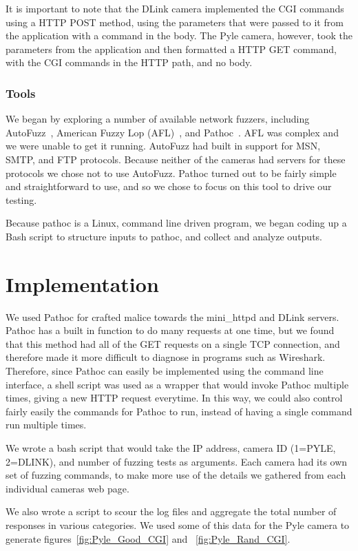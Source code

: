 \documentclass[letterpaper,twocolumn,10pt]{article}
\begin{document}
It is important to note that the DLink camera implemented the CGI commands using a HTTP POST method, using the parameters that were passed to it from the application with a command in the body. The Pyle camera, however, took the parameters from the application and then formatted a HTTP GET command, with the CGI commands in the HTTP path, and no body.


\subsubsection{Tools}
We began by exploring a number of available network fuzzers, including AutoFuzz~\cite{autofuzz}, American Fuzzy Lop (AFL)~\cite{afl}, and Pathoc~\cite{pathod}. AFL was complex and we were unable to get it running. AutoFuzz had built in support for MSN, SMTP, and FTP protocols. Because neither of the cameras had servers for these protocols we chose not to use AutoFuzz. Pathoc turned out to be fairly simple and straightforward to use, and so we chose to focus on this tool to drive our testing. 

Because pathoc is a Linux, command line driven program, we began coding up a Bash script to structure inputs to pathoc, and collect and analyze outputs. 


\section{Implementation}

We used Pathoc for crafted malice towards the mini\_httpd and DLink servers. Pathoc has a built in function to do many requests at one time, but we found that this method had all of the GET requests on a single TCP connection, and therefore made it more difficult to diagnose in programs such as Wireshark. Therefore, since Pathoc can easily be implemented using the command line interface, a shell script was used as a wrapper that would invoke Pathoc multiple times, giving a new HTTP request everytime. In this way, we could also control fairly easily the commands for Pathoc to run, instead of having a single command run multiple times.

We wrote a bash script that would take the IP address, camera ID (1=PYLE, 2=DLINK), and number of fuzzing tests as arguments. Each camera had its own set of fuzzing commands, to make more use of the details we gathered from each individual cameras web page.

We also wrote a script to scour the log files and aggregate the total number of responses in various categories. We used some of this data for the Pyle camera to generate figures~\ref{fig:Pyle_Good_CGI} and ~\ref{fig:Pyle_Rand_CGI}. 
\end{document}
